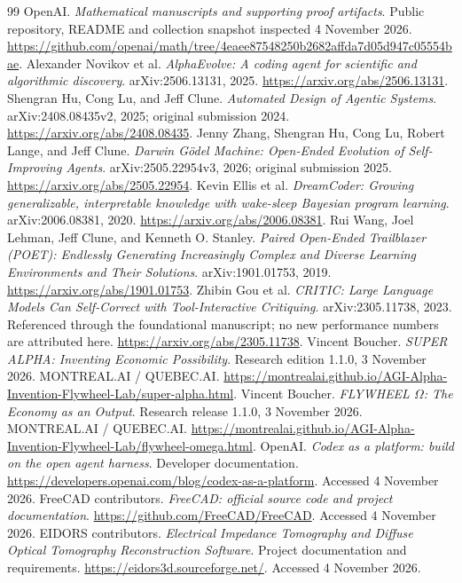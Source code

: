 \documentclass[11pt,letterpaper]{article}
\theoremstyle{remark}\newtheorem{remark}{Remark}[section]
\begin{document}
\begin{thebibliography}{99}
 OpenAI. \emph{Mathematical manuscripts and supporting proof artifacts}. Public repository, README and collection snapshot inspected 4 November 2026. \url{https://github.com/openai/math/tree/4eaee87548250b2682affda7d05d947c05554bae}.
 Alexander Novikov et al. \emph{AlphaEvolve: A coding agent for scientific and algorithmic discovery}. arXiv:2506.13131, 2025. \url{https://arxiv.org/abs/2506.13131}.
 Shengran Hu, Cong Lu, and Jeff Clune. \emph{Automated Design of Agentic Systems}. arXiv:2408.08435v2, 2025; original submission 2024. \url{https://arxiv.org/abs/2408.08435}.
 Jenny Zhang, Shengran Hu, Cong Lu, Robert Lange, and Jeff Clune. \emph{Darwin G\"odel Machine: Open-Ended Evolution of Self-Improving Agents}. arXiv:2505.22954v3, 2026; original submission 2025. \url{https://arxiv.org/abs/2505.22954}.
 Kevin Ellis et al. \emph{DreamCoder: Growing generalizable, interpretable knowledge with wake-sleep Bayesian program learning}. arXiv:2006.08381, 2020. \url{https://arxiv.org/abs/2006.08381}.
 Rui Wang, Joel Lehman, Jeff Clune, and Kenneth O. Stanley. \emph{Paired Open-Ended Trailblazer (POET): Endlessly Generating Increasingly Complex and Diverse Learning Environments and Their Solutions}. arXiv:1901.01753, 2019. \url{https://arxiv.org/abs/1901.01753}.
 Zhibin Gou et al. \emph{CRITIC: Large Language Models Can Self-Correct with Tool-Interactive Critiquing}. arXiv:2305.11738, 2023. Referenced through the foundational manuscript; no new performance numbers are attributed here. \url{https://arxiv.org/abs/2305.11738}.
 Vincent Boucher. \emph{SUPER ALPHA: Inventing Economic Possibility}. Research edition 1.1.0, 3 November 2026. MONTREAL.AI / QUEBEC.AI. \url{https://montrealai.github.io/AGI-Alpha-Invention-Flywheel-Lab/super-alpha.html}.
 Vincent Boucher. \emph{FLYWHEEL $\Omega$: The Economy as an Output}. Research release 1.1.0, 3 November 2026. MONTREAL.AI / QUEBEC.AI. \url{https://montrealai.github.io/AGI-Alpha-Invention-Flywheel-Lab/flywheel-omega.html}.
 OpenAI. \emph{Codex as a platform: build on the open agent harness}. Developer documentation. \url{https://developers.openai.com/blog/codex-as-a-platform}. Accessed 4 November 2026.
 FreeCAD contributors. \emph{FreeCAD: official source code and project documentation}. \url{https://github.com/FreeCAD/FreeCAD}. Accessed 4 November 2026.
 EIDORS contributors. \emph{Electrical Impedance Tomography and Diffuse Optical Tomography Reconstruction Software}. Project documentation and requirements. \url{https://eidors3d.sourceforge.net/}. Accessed 4 November 2026.

\end{thebibliography}
\end{document}

